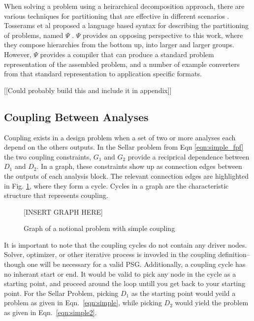   When solving a problem using a heirarchical decomposition approach, 
  there are various techniques for partitioning that are effective in different 
  scenarios \cite{krishnamachari1997optimal,michelena1997hypergraph,sobieszczanski1997,Perez2004,allison2009optimal}. 
  Tosserams et al proposed a language based syntax for describing the partitioning of problems, named $\Psi$
  \cite{tosserams2010specification}. $\Psi$ provides an opposing perspective to 
  this work, where they compose hierarchies from the bottom up, into larger and 
  larger groups. However, $\Psi$ provides a compiler that can produce a standard 
  problem representation of the assembled problem, and a number of example converters
  from that standard representation to application specific formats. 

  [[Could probably build this and include it in appendix]] 


\subsection{Coupling Between Analyses}

  Coupling exists in a design problem when a set of two or more analyses each depend on the
  others outputs. In the Sellar problem from Eqn \ref{eqn:simple_fpf} the two 
  coupling constraints, $G_1$ and $G_2$ provide a reciprical dependence between 
  $D_1$ and $D_2$. In a graph, these constraints show up as connection edges between 
  the outputs of each analysis block. The relevant connection edges are highlighted in 
  Fig. \ref{f:coupling}, where they form a cycle. Cycles in a graph are the characteristic 
  structure that represents coupling. 

  \begin{figure}
      \begin{center}
      [INSERT GRAPH HERE]
      \caption{Graph of a notional problem with simple coupling \label{f:coupling}}
      \end{center}
  \end{figure}

  It is important to note that the coupling cycles do not contain 
  any driver nodes. Solver, optimizer, or other iterative process is 
  invovled in the coupling definition--though one will be necessary for a valid 
  PSG. Additionally, a coupling cycle has no inherant start or end. It would be
  valid to pick any node in the cycle as a starting point, and proceed around the
  loop untill you get back to your starting point. For the Sellar Problem, picking 
  $D_1$ as the starting point would yeild a problem as given in 
  Eqn.~\ref{eqn:simple}, while picking $D_2$ would yield the problem as given in 
  Eqn.~\ref{eqn:simple2}.

